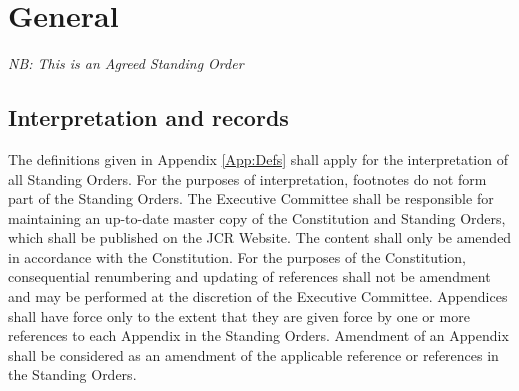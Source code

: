 \chapter{General}
\hspace*{-10pt}\textit{NB: This is an Agreed Standing Order}
\section{Interpretation and records}
\npara The definitions given in Appendix \ref{App:Defs} shall apply for the interpretation of all Standing Orders.
For the purposes of interpretation, footnotes do not form part of the Standing Orders.
\npara The Executive Committee shall be responsible for maintaining an up-to-date master copy of the Constitution and Standing Orders, which shall be published on the JCR Website.
The content shall only be amended in accordance with the Constitution.
\npara For the purposes of the Constitution, consequential renumbering and updating of references shall not be amendment and may be performed at the discretion of the Executive Committee.
\npara Appendices shall have force only to the extent that they are given force by one or more references to each Appendix in the Standing Orders.  Amendment of an Appendix shall be considered as an amendment of the applicable reference or references in the Standing Orders.
